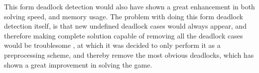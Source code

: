  
 


 
This form deadlock detection would  also have shown a great enhancement in both solving speed, and memory usage. 
The problem with doing this form deadlock detection itself, is that new undefined deadlock cases would always appear,  and therefore making complete solution capable of  removing all the deadlock cases would be troublesome , at which it was decided to only perform it as a preprocessing scheme, and thereby remove the most obvious deadlocks, which has shown a great improvement in solving the game. 




